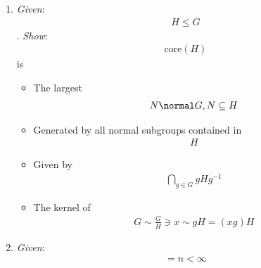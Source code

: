 \begin{enumerate}
\def\labelenumi{\arabic{enumi}.}
\setcounter{enumi}{5}
\item
  \emph{Given}: \begin{align*}
  H \leq G\end{align*}
  . \emph{Show}: \begin{align*}
  \text{core}(H)\end{align*}
   is

  \begin{itemize}
  \tightlist
  \item
    The largest \begin{align*}
    N \normal G, N \subseteq H\end{align*}
  \item
    Generated by all normal subgroups contained in \begin{align*}
    H\end{align*}
  \item
    Given by \begin{align*}
    \bigcap_{g\in G} gHg^{-1}\end{align*}
  \item
    The kernel of \begin{align*}
    G \sim \frac{G}{H} \ni x \sim gH = (xg)H\end{align*}
  \end{itemize}
\item
  \emph{Given}: \begin{align*}
  [H : G]= n < \infty\end{align*}


\end{enumerate}
